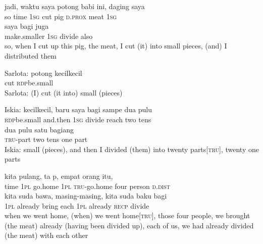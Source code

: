 \ea
\gll   jadi,   waktu    {saya}    {potong}   babi   ini,   daging   saya\\
  so   time    {\textsc{1sg}}    {cut}   pig   \textsc{d.prox}   meat   \textsc{1sg}\\
    {saya}   bagi    {juga}\\
   {make.smaller}    {\textsc{1sg}}   divide    {also}\\
\glt
so, when I cut up this pig, the meat, I cut (it) into small pieces, (and) I distributed them
\z

\ea
\gll   Sarlota:   potong   kecil{\Tilde}kecil\\
  {} cut   \textsc{rdp}{\Tilde}be.small\\
\glt
Sarlota: (I) cut (it into) small (pieces)
\z

\ea
\gll   Iskia:    {kecil{\Tilde}kecil,}    {baru}   saya   bagi   sampe   dua   pulu\\
  {} {\textsc{rdp}{\Tilde}be.small}    {and.then}   \textsc{1sg}   divide   reach   two   tens\\
   dua   pulu   satu    {bagiang}\\
   {\textsc{tru}{}-part}   two   tens   one    {part}\\
\glt
Iskia: small (pieces), and then I divided (them) into twenty parts[\textsc{tru}], twenty one parts
\z

\ea
{}   kita    {pulang,}   ta    {p,}    {empat}    {orang}   itu,\\
   {time}   \textsc{1pl}    {go.home}   \textsc{1pl}    {\textsc{tru}{}-go.home}    {four}    {person}   \textsc{d.dist}\\
\gll kita    {suda}   bawa,    {masing-masing,}    {kita}    {suda}   baku    {bagi}\\
  \textsc{1pl}    {already}   bring    {each}    {\textsc{1pl}}    {already}   \textsc{recp}    {divide}\\
\glt
when we went home, (when) we went home[\textsc{tru}], those four people, we brought (the meat) already (having been divided up), each of us, we had already divided (the meat) with each other
\z

